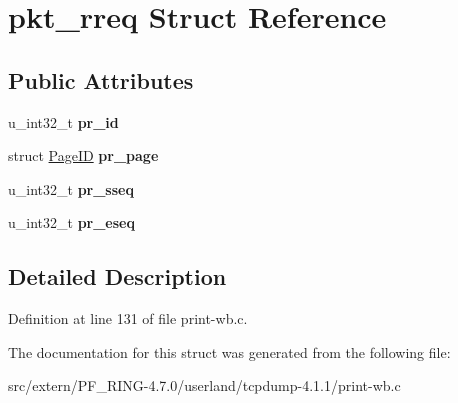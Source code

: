 \hypertarget{structpkt__rreq}{
\section{pkt\_\-rreq Struct Reference}
\label{structpkt__rreq}
}
\subsection*{Public Attributes}
\begin{DoxyCompactItemize}
\item 
\hypertarget{structpkt__rreq_a2763d2e35686998d34da770a8031c2af}{
u\_\-int32\_\-t {\bfseries pr\_\-id}}
\label{structpkt__rreq_a2763d2e35686998d34da770a8031c2af}

\item 
\hypertarget{structpkt__rreq_af6229f671f1ee5bdbd3e8d57a2a75dd0}{
struct \hyperlink{struct_page_i_d}{PageID} {\bfseries pr\_\-page}}
\label{structpkt__rreq_af6229f671f1ee5bdbd3e8d57a2a75dd0}

\item 
\hypertarget{structpkt__rreq_abf20bc97c1715bb4073f18497a070b3f}{
u\_\-int32\_\-t {\bfseries pr\_\-sseq}}
\label{structpkt__rreq_abf20bc97c1715bb4073f18497a070b3f}

\item 
\hypertarget{structpkt__rreq_a817eb7dc52e02206afeae894d955ea01}{
u\_\-int32\_\-t {\bfseries pr\_\-eseq}}
\label{structpkt__rreq_a817eb7dc52e02206afeae894d955ea01}

\end{DoxyCompactItemize}


\subsection{Detailed Description}


Definition at line 131 of file print-\/wb.c.



The documentation for this struct was generated from the following file:\begin{DoxyCompactItemize}
\item 
src/extern/PF\_\-RING-\/4.7.0/userland/tcpdump-\/4.1.1/print-\/wb.c\end{DoxyCompactItemize}
